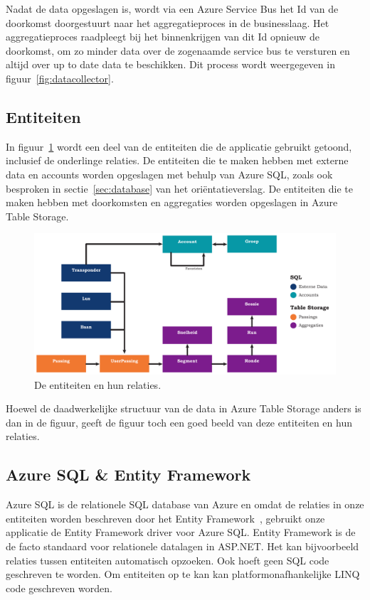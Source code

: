 Nadat de data opgeslagen is, wordt via een Azure Service Bus het Id van de doorkomst doorgestuurt naar het aggregatieproces in de businesslaag. Het aggregatieproces raadpleegt bij het binnenkrijgen van dit Id opnieuw de doorkomst, om zo minder data over de zogenaamde service bus te versturen en altijd over up to date data te beschikken. Dit process wordt weergegeven in figuur~\ref{fig:datacollector}.

\subsection{Entiteiten}
In figuur~\ref{fig:entiteiten} wordt een deel van de entiteiten die de applicatie gebruikt getoond, inclusief de onderlinge relaties. De entiteiten die te maken hebben met externe data en accounts worden opgeslagen met behulp van Azure SQL, zoals ook besproken in sectie~\ref{sec:database} van het oriëntatieverslag. De entiteiten die te maken hebben met doorkomsten en aggregaties worden opgeslagen in Azure Table Storage.

\begin{figure}[ht]
  \begin{center}
  \includegraphics[width=.9\textwidth]{style/images/Entiteiten}    
  \end{center}
  \caption{De entiteiten en hun relaties.}
  \label{fig:entiteiten}
\end{figure}

Hoewel de daadwerkelijke structuur van de data in Azure Table Storage anders is dan in de figuur, geeft de figuur toch een goed beeld van deze entiteiten en hun relaties. 

\subsection{Azure SQL \& Entity Framework}
Azure SQL is de relationele SQL database van Azure en omdat de relaties in onze entiteiten worden beschreven door het Entity Framework~\cite{entityframework-msdn, entityframework-facto}, gebruikt onze applicatie de Entity Framework driver voor Azure SQL. Entity Framework is de de facto standaard voor relationele datalagen in ASP.NET. Het kan bijvoorbeeld relaties tussen entiteiten automatisch opzoeken. Ook hoeft geen SQL code geschreven te worden. Om entiteiten op te kan kan platformonafhankelijke LINQ code geschreven worden.

